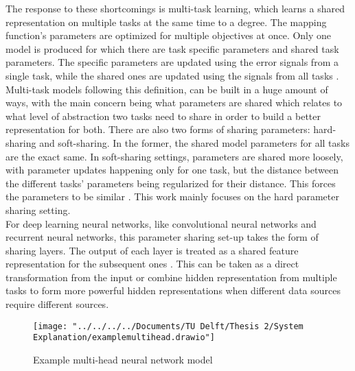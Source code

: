 The response to these shortcomings is multi-task learning, which learns a shared representation on multiple tasks at the same time to a degree. The mapping function's parameters are optimized for multiple objectives at once. Only one model is produced for which there are task specific parameters and shared task parameters. The specific parameters are updated using the error signals from a single task, while the shared ones are updated using the signals from all tasks \cite{meyer2019multi}. Multi-task models following this definition, can be built in a huge amount of ways, with the main concern being what parameters are shared which relates to what level of abstraction two tasks need to share in order to build a better representation for both. There are also two forms of sharing parameters: hard-sharing and soft-sharing. In the former, the shared model parameters for all tasks are the exact same. In soft-sharing settings, parameters are shared more loosely, with parameter updates happening only for one task, but the distance between the different tasks' parameters being regularized for their distance. This forces the parameters to be similar \citep{ruder2017overview}. This work mainly focuses on the hard parameter sharing setting. \\

For deep learning neural networks, like convolutional neural networks and recurrent neural networks, this parameter sharing set-up takes the form of sharing layers. The output of each layer is treated as a shared feature representation for the subsequent ones \citep{zhang2018overview}. This can be taken as a direct transformation from the input or combine hidden representation from multiple tasks to form more powerful hidden representations when different data sources require different sources. \\

\begin{figure}
	\centering
	\texttt{[image: "../../../../Documents/TU Delft/Thesis 2/System Explanation/examplemultihead.drawio"]}
	\caption{Example multi-head neural network model}
	\label{fig:examplemultihead}
\end{figure}

